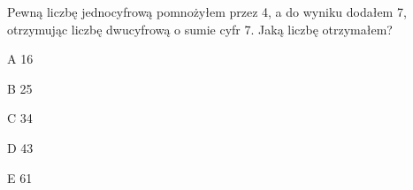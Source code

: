 \begin{tresc}
Pewną liczbę jednocyfrową pomnożyłem przez 4, a do wyniku dodałem 7, otrzymując liczbę dwucyfrową o sumie cyfr 7. Jaką liczbę otrzymałem?
\end{tresc}
\begin{wariant}{A} 16 \end{wariant}
\begin{wariant}{B} 25 \end{wariant}
\begin{wariant}{C} 34 \end{wariant}
\begin{wariant}{D} 43 \end{wariant}
\begin{wariant}{E} 61 \end{wariant}
